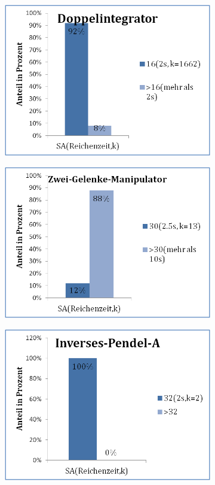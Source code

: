 \begin{figure}[!h]
	\centering
	\begin{subfigure}[t]{0.45\textwidth}%
		\centering
		\label{fig:SA_for_Doppelintegrator}
		\includegraphics[width=0.7\linewidth]{bild/30_32/Doppelintegrator.png}
	\end{subfigure}
	\begin{subfigure}[t]{0.45\textwidth}%
		\centering
		\label{fig:SA_for_zwei_Gelenk_Manipulator}
		\includegraphics[width=0.7\linewidth]{bild/30_32/2_Gelenke_Manipulator.png}
	\end{subfigure}
	\bigskip 
	\begin{subfigure}[t]{0.45\textwidth}%
		\centering
		\label{fig:SA_for_inversen_Pendel_ori}
		\includegraphics[width=0.7\linewidth]{bild/30_32/Inverses-Pendel-A.png}

\end{subfigure}
\end{figure}
